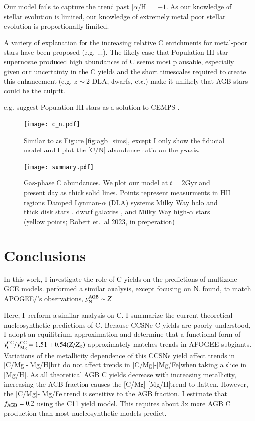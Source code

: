 \documentclass[12pt,oneside]{report}
\newcommand{\caah}{[C/Mg]-[Mg/H]}
\newcommand{\caafe}{[C/Mg]-[Mg/Fe]}
\newcommand{\Ycc}{\ensuremath{y_{\rm C}^{\rm CC}}}
\newcommand{\Yoc}{\ensuremath{y_{\rm Mg}^{\rm CC}}}
\newcommand{\citealtjack}{Robert et.\ al 2023, in preperation}
\begin{document}
Our model fails to capture the trend past [$\alpha$/H]$=-1$. As our knowledge
of stellar evolution is limited, our knowledge of extremely metal poor stellar
evolution is proportionally limited. 

A variety of explanation for the increasing relative C
enrichments for metal-poor stars have been proposed (e.g. ...). The likely case
that Population III star supernovae produced high abundances of C seems
most plausable, especially given our uncertainty in the C yields and the
short timescales required to create this enhancement (e.g. $z\sim 2$ DLA,
dwarfs, etc.) make it unlikely that AGB stars could be the culprit. 

e.g. \cite{cooke+17} suggest Population III stars as a solution to CEMPS \cite{FN15}.


\begin{figure}
    \texttt{[image: c\_n.pdf]}
    \caption[C/N abundance agreement]{Similar to as Figure \ref{fig:agb_sims}, except I only show the fiducial model and I plot the [C/N] abundance ratio on the y-axis.
    }
\end{figure}

\begin{figure}
\centering
\texttt{[image: summary.pdf]}
\caption[Gas phase abundances]{Gas-phase C abundances. We plot our model at $t=2$Gyr and present day as thick solid lines. Points represent measurments in 
    HII regions    \citep[pink circles;][]{skillman+20, esteban+02, esteban+09, esteban+14, esteban+19}
    Damped Lynman-$\alpha$ (DLA) systems \citep[blue triangles;][]{cooke+17} 
    Milky Way halo and thick disk stars \citep[green stars;][]{nissen+14, fabbian+09}. 
    dwarf galaxies \citep[red diamonds;]{berg+19},
    and Milky Way high-$\alpha$ stars (yellow points; \citealtjack)
}
\label{fig:gas_phase}
\end{figure}


\chapter{Conclusions}

In this work, I investigate the role of C yields on the predictions of multizone GCE models. \citet{james+23} performed a similar analysis, except focusing on N. \citet{james+23} found, to match APOGEE/\citet{vincenzo+21}'s observations, $y_{\rm N}^{\rm AGB} \sim  Z$. 

Here, I perform a similar analysis on C. I summarize the current theoretical nucleosynthetic predictions of C. Because CCSNe C yields are poorly understood, I adopt an equilibrium approximation and determine that a functional form of $\Ycc/\Yoc=1.51 + 0.54 (Z/Z_\odot)$ approximately matches trends in APOGEE subgiants. Variations of the metallicity dependence of this CCSNe yield affect trends in \caah but do not affect trends in \caafe when taking a slice in [Mg/H]. As all theoretical AGB C yields decrease with increasing metallicity, increasing the AGB fraction causes the \caah trend to flatten. However, the \caafe trend is sensitive to the AGB fraction. 
I estimate that $f_{\rm AGB} = 0.2$ using the C11 yield model. This requires about 3x more AGB C production than most nucleosynthetic models predict.
\end{document}
